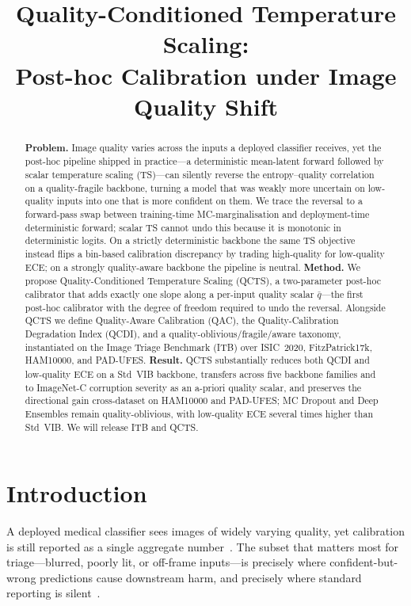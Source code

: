 \documentclass{bmvc2k}
\title{Quality-Conditioned Temperature Scaling:\\
       Post-hoc Calibration under Image Quality Shift}
\begin{document}
\maketitle
\begin{abstract}
\textbf{Problem.} Image quality varies across the inputs a deployed classifier receives, yet the post-hoc pipeline shipped in practice---a deterministic mean-latent forward followed by scalar temperature scaling (TS)---can silently reverse the entropy--quality correlation on a quality-fragile backbone, turning a model that was weakly more uncertain on low-quality inputs into one that is more confident on them. We trace the reversal to a forward-pass swap between training-time MC-marginalisation and deployment-time deterministic forward; scalar TS cannot undo this because it is monotonic in deterministic logits. On a strictly deterministic backbone the same TS objective instead flips a bin-based calibration discrepancy by trading high-quality for low-quality ECE; on a strongly quality-aware backbone the pipeline is neutral.
\textbf{Method.} We propose Quality-Conditioned Temperature Scaling (QCTS), a two-parameter post-hoc calibrator that adds exactly one slope along a per-input quality scalar $\bar q$---the first post-hoc calibrator with the degree of freedom required to undo the reversal. Alongside QCTS we define Quality-Aware Calibration (QAC), the Quality-Calibration Degradation Index (QCDI), and a quality-oblivious/fragile/aware taxonomy, instantiated on the Image Triage Benchmark (ITB) over ISIC~2020, FitzPatrick17k, HAM10000, and PAD-UFES.
\textbf{Result.} QCTS substantially reduces both QCDI and low-quality ECE on a Std~VIB backbone, transfers across five backbone families and to ImageNet-C corruption severity as an a-priori quality scalar, and preserves the directional gain cross-dataset on HAM10000 and PAD-UFES; MC Dropout and Deep Ensembles remain quality-oblivious, with low-quality ECE several times higher than Std~VIB. We will release ITB and QCTS.
\end{abstract}

\section{Introduction}

A deployed medical classifier sees images of widely varying quality, yet calibration is still reported as a single aggregate number~\cite{codella2018skin,guo2017calibration}. The subset that matters most for triage---blurred, poorly lit, or off-frame inputs---is precisely where confident-but-wrong predictions cause downstream harm, and precisely where standard reporting is silent~\cite{esteva2017dermatologist,tschandl2020human}.
\end{document}

